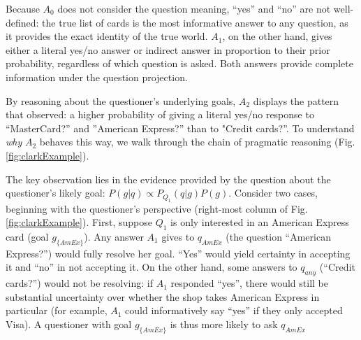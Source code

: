 \documentclass[11pt, floatsintext]{apa6}
\begin{document}
Because $A_0$ does not consider the question meaning, ``yes'' and ``no'' are not well-defined: the true list of cards is the most informative answer to any question, as it provides the exact identity of the true world. $A_1$, on the other hand, gives either a literal yes/no answer or indirect answer in proportion to their prior probability, regardless of which question is asked. Both answers provide complete information under the question projection.

By reasoning about the questioner's underlying goals, $A_2$ displays the pattern that  observed: a higher probability of giving a literal yes/no response to ``MasterCard?'' and ''American Express?'' than to "Credit cards?''. To understand \emph{why} $A_2$ behaves this way, we walk through the chain of pragmatic reasoning (Fig. \ref{fig:clarkExample}).

The key observation lies in the evidence provided by the question about the questioner's likely goal: $P(g | q) \propto P_{Q_1}(q|g)P(g)$. Consider two cases, beginning with the questioner's perspective  (right-most column of Fig. \ref{fig:clarkExample}). First, suppose $Q_1$ is only interested in an American Express card (goal $g_{\{AmEx\}}$). Any answer $A_1$ gives to $q_{AmEx}$ (the question ``American Express?'') would fully resolve her goal. ``Yes'' would yield certainty in accepting it and ``no'' in not accepting it. On the other hand, some answers to $q_{any}$ (``Credit cards?'') would not be resolving: if $A_1$ responded ``yes'', there would still be substantial uncertainty over whether the shop takes American Express in particular (for example, $A_1$ could informatively say ``yes'' if they only accepted Visa). A questioner with goal $g_{\{AmEx\}}$  is thus more likely to ask $q_{AmEx}$


\end{document}
